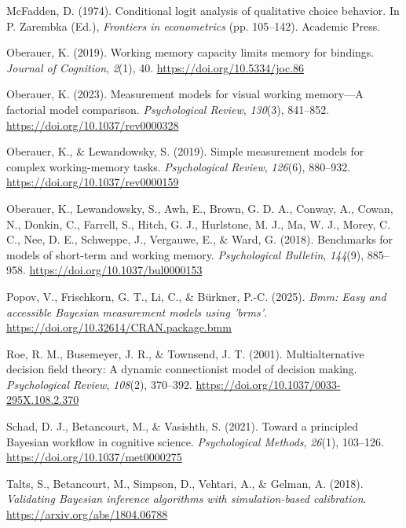\documentclass[
  man,
  floatsintext,
  longtable,
  nolmodern,
  notxfonts,
  notimes,
  colorlinks=true,linkcolor=blue,citecolor=blue,urlcolor=blue]{apa7}
\newlength{\cslhangindent}
\newenvironment{CSLReferences}[2] %
 {\begin{list}{}{%
  \setlength{\itemindent}{0pt}
  \setlength{\leftmargin}{0pt}
  \setlength{\parsep}{0pt}
  \ifodd #1
   \setlength{\leftmargin}{\cslhangindent}
   \setlength{\itemindent}{-1\cslhangindent}
  \fi
  \setlength{\itemsep}{#2\baselineskip}}}
 {\end{list}}
\begin{document}
\begin{CSLReferences}{1}{0}
McFadden, D. (1974). Conditional logit analysis of qualitative choice
behavior. In P. Zarembka (Ed.), \emph{Frontiers in econometrics} (pp.
105--142). Academic Press.

Oberauer, K. (2019). Working memory capacity limits memory for bindings.
\emph{Journal of Cognition}, \emph{2}(1), 40.
\url{https://doi.org/10.5334/joc.86}

Oberauer, K. (2023). Measurement models for visual working memory---{A}
factorial model comparison. \emph{Psychological Review}, \emph{130}(3),
841--852. \url{https://doi.org/10.1037/rev0000328}

Oberauer, K., \& Lewandowsky, S. (2019). Simple measurement models for
complex working-memory tasks. \emph{Psychological Review},
\emph{126}(6), 880--932. \url{https://doi.org/10.1037/rev0000159}

Oberauer, K., Lewandowsky, S., Awh, E., Brown, G. D. A., Conway, A.,
Cowan, N., Donkin, C., Farrell, S., Hitch, G. J., Hurlstone, M. J., Ma,
W. J., Morey, C. C., Nee, D. E., Schweppe, J., Vergauwe, E., \& Ward, G.
(2018). Benchmarks for models of short-term and working memory.
\emph{Psychological Bulletin}, \emph{144}(9), 885--958.
\url{https://doi.org/10.1037/bul0000153}

Popov, V., Frischkorn, G. T., Li, C., \& Bürkner, P.-C. (2025).
\emph{Bmm: {E}asy and accessible {B}ayesian measurement models using
'brms'}. \url{https://doi.org/10.32614/CRAN.package.bmm}

Roe, R. M., Busemeyer, J. R., \& Townsend, J. T. (2001).
Multialternative decision field theory: {A} dynamic connectionist model
of decision making. \emph{Psychological Review}, \emph{108}(2),
370--392. \url{https://doi.org/10.1037/0033-295X.108.2.370}

Schad, D. J., Betancourt, M., \& Vasishth, S. (2021). Toward a
principled {B}ayesian workflow in cognitive science. \emph{Psychological
Methods}, \emph{26}(1), 103--126.
\url{https://doi.org/10.1037/met0000275}

Talts, S., Betancourt, M., Simpson, D., Vehtari, A., \& Gelman, A.
(2018). \emph{Validating {B}ayesian inference algorithms with
simulation-based calibration}. \url{https://arxiv.org/abs/1804.06788}


\end{CSLReferences}
\end{document}
